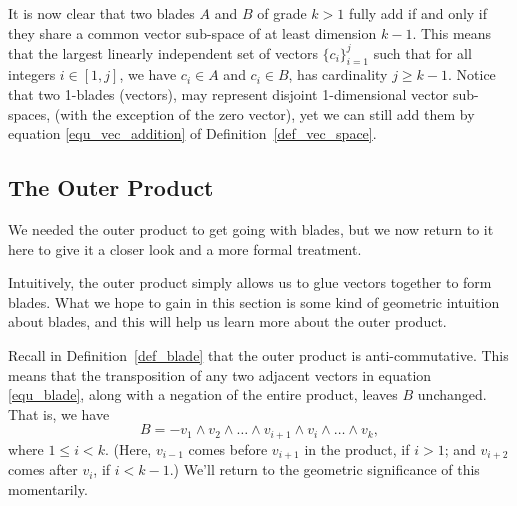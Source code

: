 \documentclass[12pt]{article}
\numberwithin{equation}{section}
\begin{document}
It is now clear that two blades $A$ and $B$ of grade $k>1$ fully add if and only if they
share a common vector sub-space of at least dimension $k-1$.  This means that the largest
linearly independent set of vectors $\{c_i\}_{i=1}^j$ such that for all integers
$i\in[1,j]$, we have $c_i\in A$ and $c_i\in B$, has cardinality $j\geq k-1$.  Notice that
two 1-blades (vectors), may represent disjoint 1-dimensional vector sub-spaces,
(with the exception of the zero vector), yet we can still add them by
equation \eqref{equ_vec_addition} of Definition~\ref{def_vec_space}.

\subsection{The Outer Product}

We needed the outer product to get going with blades, but we now
return to it here to give it a closer look and a more formal treatment.

Intuitively, the outer product simply allows us to glue vectors
together to form blades.  What we hope to gain in this section
is some kind of geometric intuition about blades, and this will
help us learn more about the outer product.

Recall in Definition~\ref{def_blade} that the outer product is anti-commutative.
This means that the transposition of any two adjacent vectors in
equation \eqref{equ_blade}, along with a negation of the
entire product, leaves $B$ unchanged.  That is, we have
\begin{equation}\label{equ_adj_trans}
B = -v_1\wedge v_2\wedge\dots\wedge v_{i+1}\wedge v_i\wedge\dots\wedge v_k,
\end{equation}
where $1\leq i<k$.  (Here, $v_{i-1}$ comes before $v_{i+1}$ in the product,
if $i>1$; and $v_{i+2}$ comes after $v_i$, if $i<k-1$.)
We'll return to the geometric significance of this momentarily.
\end{document}
